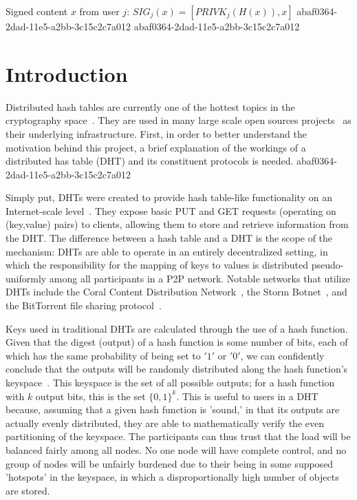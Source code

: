 \documentclass[12pt]{article}
\begin{document}
Signed content $x$ from user $j$: $SIG_j(x) = \left[ PRIVK_j( H(x) ), x \right]$
abaf0364-2dad-11e5-a2bb-3c15c2c7a012
abaf0364-2dad-11e5-a2bb-3c15c2c7a012\section{Introduction}
\par Distributed hash tables are currently one of the hottest topics in the cryptography space~\cite{Stoica:2001dj,Rowstron:2001ea,Ratnasamy:2001wn}. They are used in many large scale open sources projects~\cite{Freitas:2013tb,Xu:2010vs,Perfitt:2010fh} as their underlying infrastructure. First, in order to better understand the motivation behind this project, a brief explanation of the workings of a distributed has table (DHT) and its constituent protocols is needed.
abaf0364-2dad-11e5-a2bb-3c15c2c7a012
\par Simply put, DHTs were created to provide hash table-like functionality on an Internet-scale level~\cite{Ratnasamy:2001wn}. They expose basic PUT and GET requests (operating on (key,value) pairs) to clients, allowing them to store and retrieve information from the DHT. The difference between a hash table and a DHT is the scope of the mechanism: DHTs are able to operate in an entirely decentralized setting, in which the responsibility for the mapping of keys to values is distributed pseudo-uniformly among all participants in a P2P network. Notable networks that utilize DHTs include the Coral Content Distribution Network~\cite{Freedman:2004vb}, the Storm Botnet~\cite{Holz:2008uk}, and the BitTorrent file sharing protocol~\cite{Cohen:y1_8mBnw}.

\par Keys used in traditional DHTs are calculated through the use of a hash function. Given that the digest (output) of a hash function is some number of bits, each of which has the same probability of being set to $'1'$ or $'0'$, we can confidently conclude that the outputs will be randomly distributed along the hash function's keyspace~. This keyspace is the set of all possible outputs; for a hash function with $k$ output bits, this is the set $\{0,1\}^k$. This is useful to users in a DHT because, assuming that a given hash function is 'sound,' in that its outputs are actually evenly distributed, they are able to mathematically verify the even partitioning of the keyspace. The participants can thus trust that the load will be balanced fairly among all nodes. No one node will have complete control, and no group of nodes will be unfairly burdened due to their being in some supposed 'hotspots' in the keyspace, in which a disproportionally high number of objects are stored.~
\end{document}
